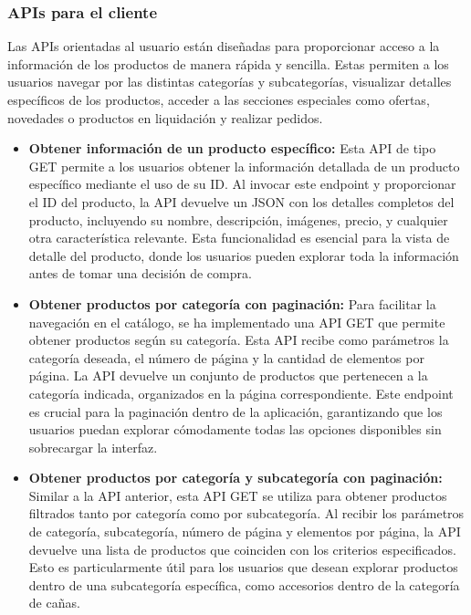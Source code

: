 \subsubsection{APIs para el cliente}\label{subsec5.3.2.1}
Las APIs orientadas al usuario están diseñadas para proporcionar acceso a la información de los productos de manera rápida y sencilla. Estas permiten a los usuarios navegar por las distintas categorías y subcategorías, visualizar detalles específicos de los productos, acceder a las secciones especiales como ofertas, novedades o productos en liquidación y realizar pedidos.

\begin{itemize}
    \item \textbf{Obtener información de un producto específico:} Esta API de tipo GET permite a los usuarios obtener la información detallada de un producto específico mediante el uso de su ID. Al invocar este endpoint y proporcionar el ID del producto, la API devuelve un JSON con los detalles completos del producto, incluyendo su nombre, descripción, imágenes, precio, y cualquier otra característica relevante. Esta funcionalidad es esencial para la vista de detalle del producto, donde los usuarios pueden explorar toda la información antes de tomar una decisión de compra.
    
    \item \textbf{Obtener productos por categoría con paginación:} Para facilitar la navegación en el catálogo, se ha implementado una API GET que permite obtener productos según su categoría. Esta API recibe como parámetros la categoría deseada, el número de página y la cantidad de elementos por página. La API devuelve un conjunto de productos que pertenecen a la categoría indicada, organizados en la página correspondiente. Este endpoint es crucial para la paginación dentro de la aplicación, garantizando que los usuarios puedan explorar cómodamente todas las opciones disponibles sin sobrecargar la interfaz.
    
    \item \textbf{Obtener productos por categoría y subcategoría con paginación:} Similar a la API anterior, esta API GET se utiliza para obtener productos filtrados tanto por categoría como por subcategoría. Al recibir los parámetros de categoría, subcategoría, número de página y elementos por página, la API devuelve una lista de productos que coinciden con los criterios especificados. Esto es particularmente útil para los usuarios que desean explorar productos dentro de una subcategoría específica, como accesorios dentro de la categoría de cañas.


\end{itemize}
